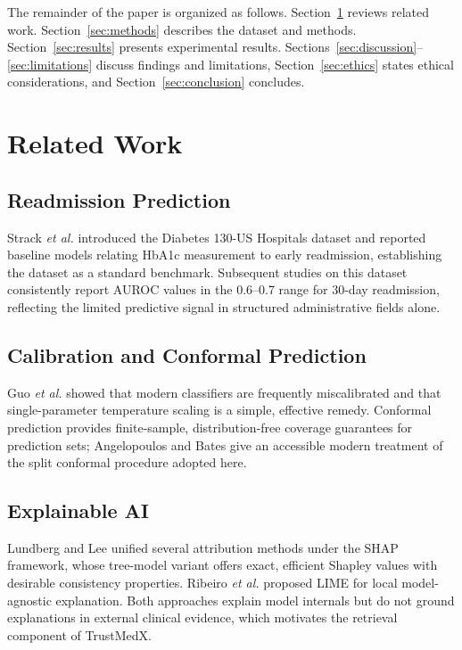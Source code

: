 \documentclass[12pt,onecolumn,journal]{IEEEtran}
\begin{document}
The remainder of the paper is organized as follows. Section~\ref{sec:related} reviews related work. Section~\ref{sec:methods} describes the dataset and methods. Section~\ref{sec:results} presents experimental results. Sections~\ref{sec:discussion}--\ref{sec:limitations} discuss findings and limitations, Section~\ref{sec:ethics} states ethical considerations, and Section~\ref{sec:conclusion} concludes.

\section{Related Work}
\label{sec:related}
\subsection{Readmission Prediction}
Strack \emph{et al.} \cite{strack2014impact} introduced the Diabetes 130-US Hospitals dataset and reported baseline models relating HbA1c measurement to early readmission, establishing the dataset as a standard benchmark. Subsequent studies on this dataset consistently report AUROC values in the 0.6--0.7 range for 30-day readmission, reflecting the limited predictive signal in structured administrative fields alone.

\subsection{Calibration and Conformal Prediction}
Guo \emph{et al.} \cite{guo2017calibration} showed that modern classifiers are frequently miscalibrated and that single-parameter temperature scaling is a simple, effective remedy. Conformal prediction \cite{vovk2005algorithmic} provides finite-sample, distribution-free coverage guarantees for prediction sets; Angelopoulos and Bates \cite{angelopoulos2021gentle} give an accessible modern treatment of the split conformal procedure adopted here.

\subsection{Explainable AI}
Lundberg and Lee \cite{lundberg2017unified} unified several attribution methods under the SHAP framework, whose tree-model variant offers exact, efficient Shapley values with desirable consistency properties. Ribeiro \emph{et al.} \cite{ribeiro2016should} proposed LIME for local model-agnostic explanation. Both approaches explain model internals but do not ground explanations in external clinical evidence, which motivates the retrieval component of TrustMedX.
\end{document}
